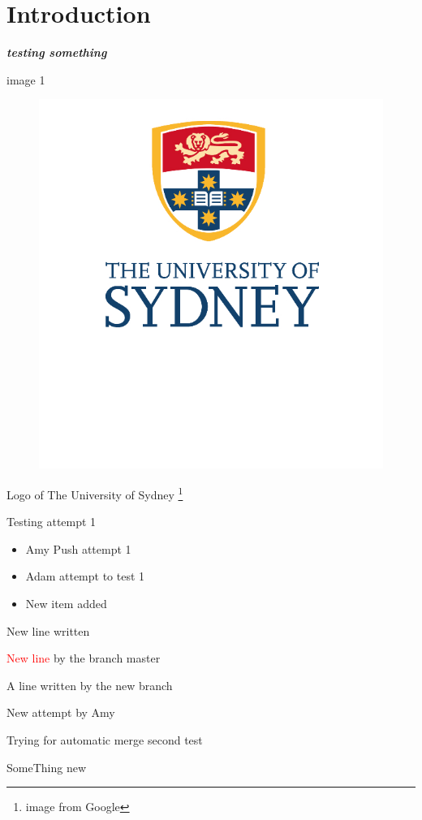 \documentclass[10pt]{article}
\newcommand{\boldit}[1]{\textbf{\textit{#1}}}
\begin{document}
\section{\textsf{Introduction}}
\boldit{testing something}

image 1 
\begin{figure}[hbt!]
  \centering
  \includegraphics{usyd}
\end{figure}

Logo of The University of Sydney \footnote{image from Google}

Testing attempt 1
\begin{itemize}
  \item Amy Push attempt 1
  \item Adam attempt to test 1
  \item New item added
\end{itemize}
New line written

\textcolor{red}{New line} by the branch master


A line written by the new branch

New attempt by Amy


Trying for automatic merge
second test

SomeThing new
\end{document}
